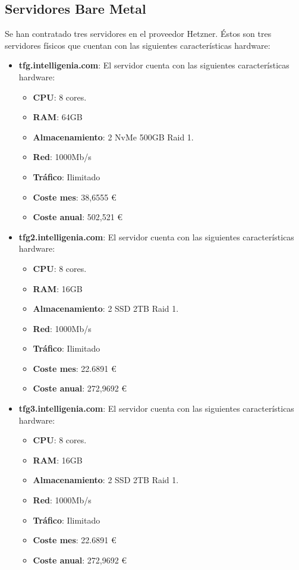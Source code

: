 	\subsection{Servidores Bare Metal}
	\label{servidores_bare_metal}
	
	\begin{text}
		Se han contratado tres servidores en el proveedor Hetzner. Éstos son tres servidores físicos que cuentan con las siguientes características hardware:
		
		\begin{itemize}
			\item \textbf{tfg.intelligenia.com}: El servidor cuenta con las siguientes características hardware:
			
			\begin{itemize}
				\item \textbf{CPU}: 8 cores.
				\item \textbf{RAM}: 64GB 
				\item \textbf{Almacenamiento}: 2 NvMe 500GB Raid 1.
				\item \textbf{Red}: 1000Mb/s
				\item \textbf{Tráfico}: Ilimitado
				\item \textbf{Coste mes}: 38,6555 \euro
				\item \textbf{Coste anual}: 502,521 \euro
			\end{itemize}
			
			\item \textbf{tfg2.intelligenia.com}: El servidor cuenta con las siguientes características hardware:
			
			\begin{itemize}
				\item \textbf{CPU}: 8 cores.
				\item \textbf{RAM}: 16GB 
				\item \textbf{Almacenamiento}: 2 SSD 2TB Raid 1.
				\item \textbf{Red}: 1000Mb/s
				\item \textbf{Tráfico}: Ilimitado
				\item \textbf{Coste mes}: 22.6891 \euro
				\item \textbf{Coste anual}: 272,9692 \euro
			\end{itemize}
			
			\item \textbf{tfg3.intelligenia.com}: El servidor cuenta con las siguientes características hardware:
			
			\begin{itemize}
				\item \textbf{CPU}: 8 cores.
				\item \textbf{RAM}: 16GB 
				\item \textbf{Almacenamiento}: 2 SSD 2TB Raid 1.
				\item \textbf{Red}: 1000Mb/s
				\item \textbf{Tráfico}: Ilimitado
				\item \textbf{Coste mes}: 22.6891 \euro
				\item \textbf{Coste anual}: 272,9692 \euro 
			\end{itemize}
		\end{itemize}
		

\end{text}
